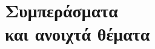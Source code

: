 \chapter[Συμπεράσματα και ανοιχτά θέματα]{Συμπεράσματα \\και ανοιχτά θέματα}\label{chapter:5-conclusions-open-areas}


